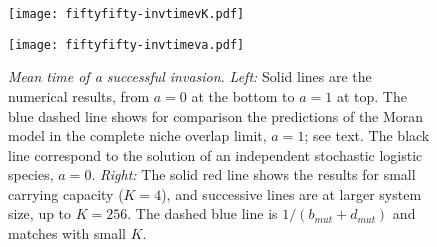 \begin{figure}[ht!]
	\centering
	\begin{minipage}{0.49\linewidth}
		\centering
		\texttt{[image: fiftyfifty-invtimevK.pdf]}
	\end{minipage}
	\begin{minipage}{0.49\linewidth}
		\centering
		\texttt{[image: fiftyfifty-invtimeva.pdf]}
	\end{minipage}
	\caption{\emph{Mean time of a successful invasion.}
		\emph{Left:} Solid lines are the numerical results, from $a=0$ at the bottom to $a=1$ at top. The blue dashed line shows for comparison the predictions of the Moran model in the complete niche overlap limit, $a=1$; see text. The black line correspond to the solution of an independent stochastic logistic species, $a=0$.
		\emph{Right:} The solid red line shows the results for small carrying capacity ($K=4$), and successive lines are at larger system size, up to $K=256$. The dashed blue line is $1/(b_{mut}+d_{mut})$ and matches with small $K$.
	} \label{Tsucc}
\end{figure}

